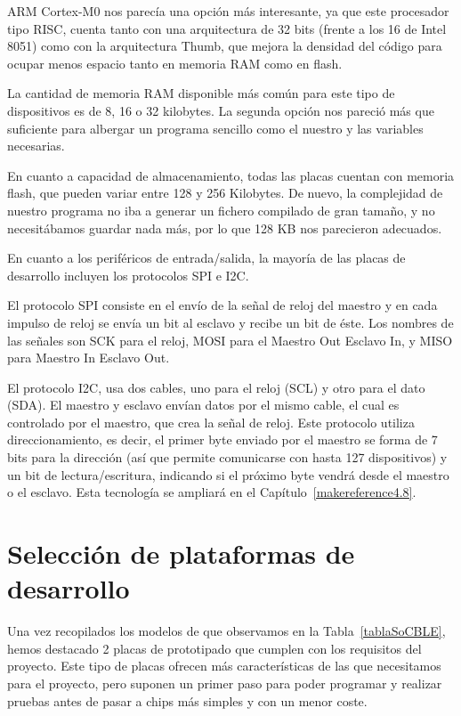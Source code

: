 ARM Cortex-M0 nos parecía una opción más interesante, ya que este procesador tipo RISC, cuenta tanto con una arquitectura de 32 bits (frente a los 16 de Intel 8051) como con la arquitectura Thumb, que mejora la densidad del código para ocupar menos espacio tanto en memoria RAM como en flash.

La cantidad de memoria RAM disponible más común para este tipo de dispositivos es de 8, 16 o 32 kilobytes. La segunda opción nos pareció más que suficiente para albergar un programa sencillo como el nuestro y las variables necesarias.

En cuanto a capacidad de almacenamiento, todas las placas cuentan con memoria flash, que pueden variar entre 128 y 256 Kilobytes. De nuevo, la complejidad de nuestro programa no iba a generar un fichero compilado de gran tamaño, y no necesitábamos guardar nada más, por lo que 128 KB nos parecieron adecuados.

En cuanto a los periféricos de entrada/salida, la mayoría de las placas de desarrollo incluyen los protocolos SPI e I2C.

El protocolo SPI consiste en el envío de la señal de reloj del maestro y en cada impulso de reloj se envía un bit al esclavo y recibe un bit de éste. Los nombres de las señales son SCK para el reloj, MOSI para el Maestro Out Esclavo In, y MISO para Maestro In Esclavo Out.

El protocolo I2C, usa dos cables, uno para el reloj (SCL) y otro para el dato (SDA). El maestro y esclavo envían datos por el mismo cable, el cual es controlado por el maestro, que crea la señal de reloj. Este protocolo utiliza direccionamiento, es decir, el primer byte enviado por el maestro se forma de 7 bits para la dirección (así que permite comunicarse con hasta 127 dispositivos) y un bit de lectura/escritura, indicando si el próximo byte vendrá desde el maestro o el esclavo. Esta tecnología se ampliará en el Capítulo~\ref{makereference4.8}.

\section{Selección de plataformas de desarrollo}
\label{makereference3.3}

Una vez recopilados los modelos de que observamos en la Tabla~\ref{tablaSoCBLE}, hemos destacado 2 placas de prototipado que cumplen con los requisitos del proyecto. Este tipo de placas ofrecen más características de las que necesitamos para el proyecto, pero suponen un primer paso para poder programar y realizar pruebas antes de pasar a chips más simples y con un menor coste. 

